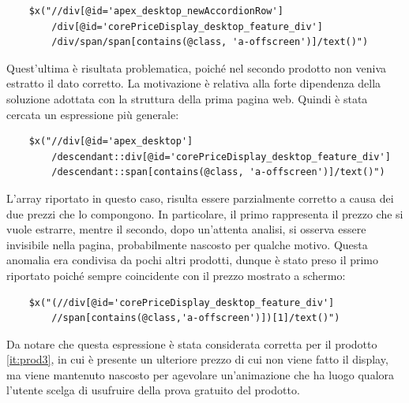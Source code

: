 \begin{verbatim}
    $x("//div[@id='apex_desktop_newAccordionRow']
        /div[@id='corePriceDisplay_desktop_feature_div']
        /div/span/span[contains(@class, 'a-offscreen')]/text()")
\end{verbatim}

Quest'ultima è risultata problematica, poiché nel secondo prodotto non veniva estratto il dato corretto. La motivazione è relativa alla forte dipendenza della soluzione adottata con la struttura della prima pagina web. Quindi è stata cercata un espressione più generale:

\begin{verbatim}
    $x("//div[@id='apex_desktop']
        /descendant::div[@id='corePriceDisplay_desktop_feature_div']
        /descendant::span[contains(@class, 'a-offscreen')]/text()")
\end{verbatim}

L'array riportato in questo caso, risulta essere parzialmente corretto a causa dei due prezzi che lo compongono. In particolare, il primo rappresenta il prezzo che si vuole estrarre, mentre il secondo, dopo un'attenta analisi, si osserva essere invisibile nella pagina, probabilmente nascosto per qualche motivo. Questa anomalia era condivisa da pochi altri prodotti, dunque 
è stato preso il primo riportato poiché sempre coincidente con il prezzo mostrato a schermo:

\begin{verbatim}
    $x("(//div[@id='corePriceDisplay_desktop_feature_div']
        //span[contains(@class,'a-offscreen')])[1]/text()")
\end{verbatim}

Da notare che questa espressione è stata considerata corretta per il prodotto \ref{it:prod3}, in cui è presente un ulteriore prezzo di cui non viene fatto il display, ma viene mantenuto nascosto per agevolare un'animazione che ha luogo qualora l'utente scelga di usufruire della prova gratuito del prodotto.

